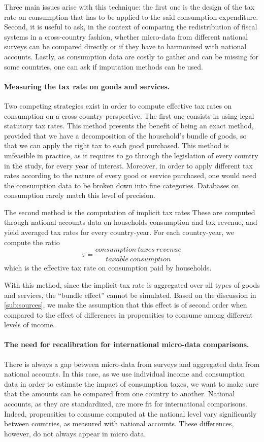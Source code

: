 \documentclass[12pt]{article}
\begin{document}
Three main issues arise with this technique: the first one is the design of the tax rate on consumption that has to be applied to the said consumption expenditure. Second, it is useful to ask, in the context of comparing the redistribution of fiscal systems in a cross-country fashion, whether micro-data from different national surveys can be compared directly or if they have to harmonized with national accounts. Lastly, as consumption data are costly to gather and can be missing for some countries, one can ask if imputation methods can be used.


\paragraph{Measuring the tax rate on goods and services.} Two competing strategies exist in order to compute effective tax rates on consumption on a cross-country perspective. The first one consists in using legal statutory tax rates. This method presents the benefit of being an exact method, provided that we have a decomposition of the household's bundle of goods, so that we can apply the right tax to each good purchased. This method is unfeasible in practice, as it requires to go through the legislation of every country in the study, for every year of interest. Moreover, in order to apply different tax rates according to the nature of every good or service purchased, one would need the consumption data to be broken down into fine categories. Databases on consumption rarely match this level of precision.

The second method is the computation of implicit tax rates These are computed through national accounts data on households consumption and tax revenue, and yield averaged tax rates for every country-year. For each country-year, we compute the ratio
\[ \tau = \frac{consumption\ taxes\ revenue}{taxable\ consumption} \]
which is the effective tax rate on consumption paid by households.

With this method, since the implicit tax rate is aggregated over all types of goods and services, the ``bundle effect'' cannot be simulated. Based on the discussion in \autoref{sub:sources}, we make the assumption that this effect is of second order when compared to the effect of differences in propensities to consume among different levels of income.

\paragraph{The need for recalibration for international micro-data comparisons.} There is always a gap between micro-data from surveys and aggregated data from national accounts. In this case, as we use individual income and consumption data in order to estimate the impact of consumption taxes, we want to make sure that the amounts can be compared from one country to another. National accounts, as they are standardized, are more fit for international comparisons. Indeed, propensities to consume computed at the national level vary significantly between countries, as measured with national accounts. These differences, however, do not always appear in micro data. 
\end{document}
